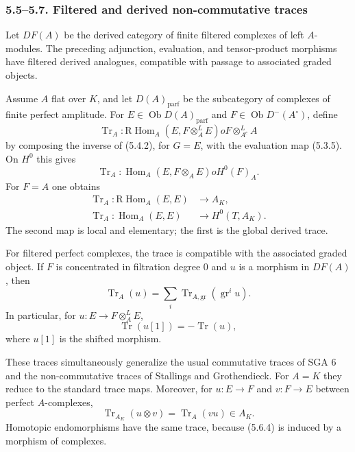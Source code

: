 \documentclass[12pt]{article}
\newcommand{\Hom}{\operatorname{Hom}}
\newcommand{\Tr}{\operatorname{Tr}}
\newcommand{\ob}{\operatorname{Ob}}
\newcommand{\R}{\mathrm R}
\begin{document}
\subsubsection*{5.5--5.7. Filtered and derived non-commutative traces}
Let $DF(A)$ be the derived category of finite filtered complexes of left $A$-modules. The preceding adjunction, evaluation, and tensor-product morphisms have filtered derived analogues, compatible with passage to associated graded objects.

Assume $A$ flat over $K$, and let $D(A)_{\mathrm{parf}}$ be the subcategory of complexes of finite perfect amplitude. For $E\in\ob D(A)_{\mathrm{parf}}$ and $F\in\ob D^{-}(A^{\circ})$, define
\begin{equation}
   \Tr_A:\R\Hom_A(E,F\otimes_A^LE)	o F\otimes_{A^e}^LA             \tag{5.6.1}
\end{equation}
by composing the inverse of (5.4.2), for $G=E$, with the evaluation map (5.3.5). On $H^0$ this gives
\begin{equation}
   \Tr_A:\Hom_A(E,F\otimes_AE)	o H^0(F)_A.                       \tag{5.6.2}
\end{equation}
For $F=A$ one obtains
\begin{align}
   \Tr_A:\R\Hom_A(E,E)&\to A_K,                                   \tag{5.6.3}\\
   \Tr_A:\Hom_A(E,E)&\to H^0(T,A_K).                              \tag{5.6.4}
\end{align}
The second map is local and elementary; the first is the global derived trace.

For filtered perfect complexes, the trace is compatible with the associated graded object. If $F$ is concentrated in filtration degree $0$ and $u$ is a morphism in $DF(A)$, then
\begin{equation}
   \Tr_A(u)=\sum_i\Tr_{A,\mathrm{gr}}(\operatorname{gr}^iu).        \tag{5.6.5}
\end{equation}
In particular, for $u:E\to F\otimes_A^LE$,
\begin{equation}
   \Tr(u[1])=-\Tr(u),                                              \tag{5.6.6}
\end{equation}
where $u[1]$ is the shifted morphism.

These traces simultaneously generalize the usual commutative traces of SGA 6 and the non-commutative traces of Stallings and Grothendieck. For $A=K$ they reduce to the standard trace maps. Moreover, for $u:E\to F$ and $v:F\to E$ between perfect $A$-complexes,
\begin{equation}
   \Tr_{A_K}(u\otimes v)=\Tr_A(vu)\in A_K.                         \tag{5.7.1}
\end{equation}
Homotopic endomorphisms have the same trace, because (5.6.4) is induced by a morphism of complexes.
\end{document}
